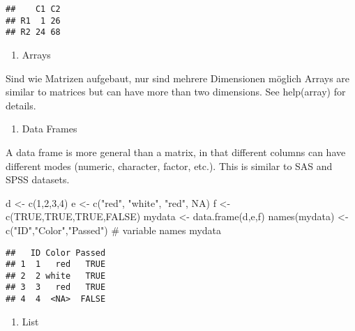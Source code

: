 \documentclass[]{article}
\newenvironment{Shaded}{\begin{snugshade}}{\end{snugshade}}
\newcommand{\KeywordTok}[1]{\textcolor[rgb]{0.94,0.87,0.69}{{#1}}}
\newcommand{\DecValTok}[1]{\textcolor[rgb]{0.86,0.86,0.80}{{#1}}}
\newcommand{\StringTok}[1]{\textcolor[rgb]{0.80,0.58,0.58}{{#1}}}
\newcommand{\CommentTok}[1]{\textcolor[rgb]{0.50,0.62,0.50}{{#1}}}
\newcommand{\OtherTok}[1]{\textcolor[rgb]{0.94,0.94,0.56}{{#1}}}
\newcommand{\NormalTok}[1]{\textcolor[rgb]{0.80,0.80,0.80}{{#1}}}
\begin{document}
\begin{verbatim}
##    C1 C2
## R1  1 26
## R2 24 68
\end{verbatim}

\begin{enumerate}
\def\labelenumi{\arabic{enumi}.}
\setcounter{enumi}{2}
\itemsep1pt\parskip0pt
\item
  Arrays
\end{enumerate}

Sind wie Matrizen aufgebaut, nur sind mehrere Dimensionen möglich Arrays
are similar to matrices but can have more than two dimensions. See
help(array) for details.

\begin{enumerate}
\def\labelenumi{\arabic{enumi}.}
\setcounter{enumi}{3}
\itemsep1pt\parskip0pt
\item
  Data Frames
\end{enumerate}

A data frame is more general than a matrix, in that different columns
can have different modes (numeric, character, factor, etc.). This is
similar to SAS and SPSS datasets.

\begin{Shaded}
\begin{Highlighting}[]
\NormalTok{d <-}\StringTok{ }\KeywordTok{c}\NormalTok{(}\DecValTok{1}\NormalTok{,}\DecValTok{2}\NormalTok{,}\DecValTok{3}\NormalTok{,}\DecValTok{4}\NormalTok{)}
\NormalTok{e <-}\StringTok{ }\KeywordTok{c}\NormalTok{(}\StringTok{"red"}\NormalTok{, }\StringTok{"white"}\NormalTok{, }\StringTok{"red"}\NormalTok{, }\OtherTok{NA}\NormalTok{)}
\NormalTok{f <-}\StringTok{ }\KeywordTok{c}\NormalTok{(}\OtherTok{TRUE}\NormalTok{,}\OtherTok{TRUE}\NormalTok{,}\OtherTok{TRUE}\NormalTok{,}\OtherTok{FALSE}\NormalTok{)}
\NormalTok{mydata <-}\StringTok{ }\KeywordTok{data.frame}\NormalTok{(d,e,f)}
\KeywordTok{names}\NormalTok{(mydata) <-}\StringTok{ }\KeywordTok{c}\NormalTok{(}\StringTok{"ID"}\NormalTok{,}\StringTok{"Color"}\NormalTok{,}\StringTok{"Passed"}\NormalTok{) }\CommentTok{# variable names}
\NormalTok{mydata}
\end{Highlighting}
\end{Shaded}

\begin{verbatim}
##   ID Color Passed
## 1  1   red   TRUE
## 2  2 white   TRUE
## 3  3   red   TRUE
## 4  4  <NA>  FALSE
\end{verbatim}

\begin{enumerate}
\def\labelenumi{\arabic{enumi}.}
\setcounter{enumi}{4}
\itemsep1pt\parskip0pt
\item
  List
\end{enumerate}
\end{document}
